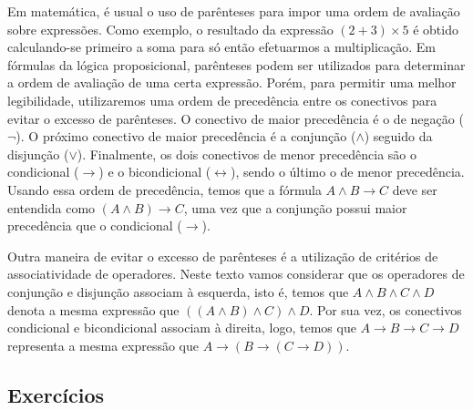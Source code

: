 Em matem\'atica, \'e usual o uso de par\^enteses para impor uma ordem
de avalia\c{c}\~ao sobre express\~oes. Como exemplo, o resultado da express\~ao $(2
+ 3)\times 5$ \'e obtido calculando-se primeiro a soma para s\'o
ent\~ao efetuarmos a multiplica\c{c}\~ao. Em f\'ormulas da l\'ogica
proposicional, par\^enteses podem ser utilizados para determinar a
ordem de avalia\c{c}\~ao de uma certa express\~ao.
Por\'em, para permitir uma melhor legibilidade, utilizaremos uma ordem de preced\^encia entre
os conectivos para evitar o excesso de par\^enteses. O conectivo de
maior preced\^encia \'e o de nega\c{c}\~ao ($\neg$). O pr\'oximo
conectivo de maior preced\^encia \'e a conjun\c{c}\~ao ($\land$)
seguido da disjun\c{c}\~ao ($\lor$). Finalmente, os dois conectivos de menor
preced\^encia s\~ao o condicional ($\to$) e o bicondicional
($\leftrightarrow$), sendo o \'ultimo o de menor preced\^encia.
Usando essa ordem de preced\^encia, temos que a f\'ormula $A \land  B
\to C$ deve ser entendida como $(A \land B) \to C$, uma vez que a
conjun\c{c}\~ao possui maior preced\^encia que o condicional ($\to$).

Outra maneira de evitar o excesso de par\^enteses \'e a
utiliza\c{c}\~ao de crit\'erios de associatividade de
operadores. Neste texto vamos considerar que os operadores de
conjun\c{c}\~ao e disjun\c{c}\~ao associam \`a esquerda, isto \'e, 
temos que $A \land B \land C \land D$ denota a mesma express\~ao que
$((A \land B) \land C) \land D$. Por sua vez, os conectivos
condicional e bicondicional associam \`a direita, logo, temos que
$A \to B \to C \to D$ representa a mesma express\~ao  que
$A \to (B \to (C \to D))$.


\subsection{Exerc\'icios}


